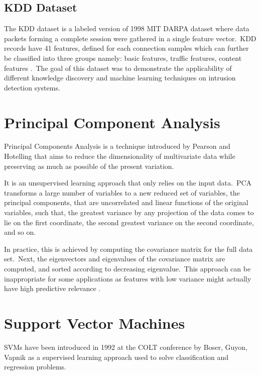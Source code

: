 				\subsection{KDD Dataset}

					The KDD dataset is a labeled version of 1998 MIT DARPA dataset where data packets forming a complete session were gathered in a single feature vector.\ KDD records have 41 features, defined for each connection samples which can further be classified into three groups namely: basic features, traffic features, content features \cite{Mahbod:KDD}.\ The goal of this dataset was to demonstrate the applicability of different knowledge discovery and machine learning techniques on intrusion detection systems.

		\section{Principal Component Analysis}

			Principal Components Analysis is a technique introduced by Pearson and Hotelling that aims to reduce the dimensionality of multivariate data while preserving as much as possible of the present variation.

			It is an unsupervised learning approach that only relies on the input data.\ PCA transforms a large number of variables to a new reduced set of variables, the principal components, that are uncorrelated and linear functions of the original variables, such that, the greatest variance by any projection of the data comes to lie on the first coordinate, the second greatest variance on the second coordinate, and so on.
			
			In practice, this is achieved by computing the covariance matrix for the full data set.\ Next, the eigenvectors and eigenvalues of the covariance matrix are computed, and sorted according to decreasing eigenvalue.\ This approach can be inappropriate for some applications as features with low variance might actually have high predictive relevance \cite{pca}.

		\section{Support Vector Machines}
		\label{svmSection}

			SVMs have been introduced in 1992 at the COLT conference by Boser, Guyon, Vapnik as a supervised learning approach used to solve classification and regression problems.

